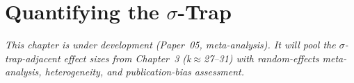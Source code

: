 \chapter{Quantifying the $\sigma$-Trap}
\label{ch:meta-analysis}

\textit{This chapter is under development (Paper~05, meta-analysis). It will pool the
$\sigma$-trap-adjacent effect sizes from Chapter~3 (k$\approx$27--31) with
random-effects meta-analysis, heterogeneity, and publication-bias assessment.}
